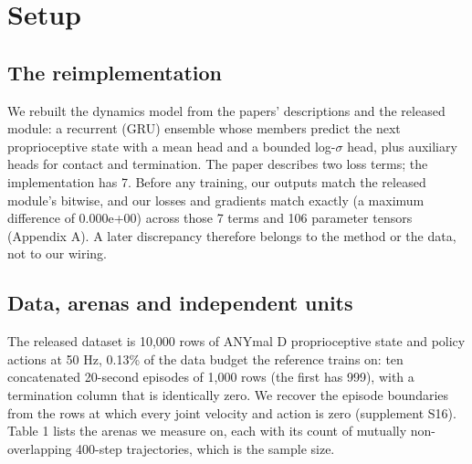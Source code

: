 \documentclass[10pt]{article}
\begin{document}
\section{Setup}

\subsection{The reimplementation}

We rebuilt the dynamics model from the papers' descriptions and the released module: a recurrent (GRU) ensemble whose members predict the next proprioceptive state with a mean head and a bounded log-$\sigma$ head, plus auxiliary heads for contact and termination. The paper describes two loss terms; the implementation has 7. Before any training, our outputs match the released module's bitwise, and our losses and gradients match exactly (a maximum difference of 0.000e+00) across those 7 terms and 106 parameter tensors (Appendix A). A later discrepancy therefore belongs to the method or the data, not to our wiring.

\subsection{Data, arenas and independent units}

The released dataset is 10,000 rows of ANYmal D proprioceptive state and policy actions at 50 Hz, 0.13\% of the data budget the reference trains on: ten concatenated 20-second episodes of 1,000 rows (the first has 999), with a termination column that is identically zero. We recover the episode boundaries from the rows at which every joint velocity and action is zero (supplement S16). Table 1 lists the arenas we measure on, each with its count of mutually non-overlapping 400-step trajectories, which is the sample size.

\begin{center}\small{}\end{center}
\end{document}
